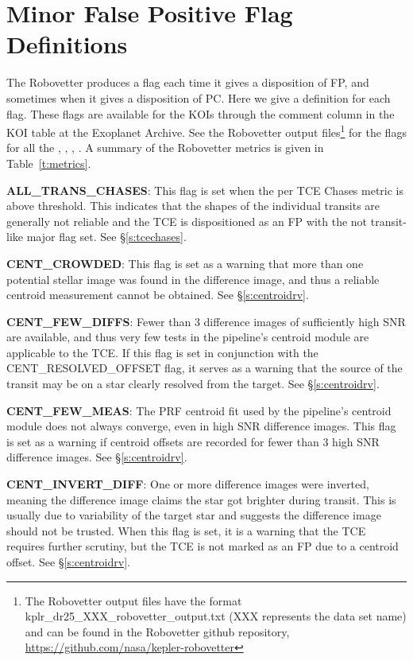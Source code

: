 \section{Minor False Positive Flag Definitions}
\label{s:minorflags}
The Robovetter produces a flag each time it gives a disposition of FP, and sometimes when it gives a disposition of PC.  Here we give a definition for each flag.   These flags are available for the KOIs through the comment column in the KOI table at the Exoplanet Archive. See the Robovetter output files\footnote{The Robovetter output files have the format kplr\_dr25\_XXX\_robovetter\_output.txt (XXX represents the data set name) and can be found in the Robovetter github repository, \url{https://github.com/nasa/kepler-robovetter}} for the flags for all the , , , . A summary of the Robovetter metrics is given in Table~\ref{t:metrics}.


\textbf{ALL\_TRANS\_CHASES}: This flag is set when the per TCE Chases metric is above threshold. This indicates that the shapes of the individual transits are generally not reliable and the TCE is dispositioned as an FP with the not transit-like major flag set. See \S\ref{s:tcechases}.

\textbf{CENT\_CROWDED}: This flag is set as a warning that more than one potential stellar image was found in the difference image, and thus a reliable centroid measurement cannot be obtained. See \S\ref{s:centroidrv}.

\textbf{CENT\_FEW\_DIFFS}: Fewer than 3 difference images of sufficiently high SNR are available, and thus very few tests in the pipeline's centroid module are applicable to the TCE. If this flag is set in conjunction with the CENT\_RESOLVED\_OFFSET flag, it serves as a warning that the source of the transit may be on a star clearly resolved from the target. See \S\ref{s:centroidrv}.

\textbf{CENT\_FEW\_MEAS}: The PRF centroid fit used by the pipeline's centroid module does not always converge, even in high SNR difference images. This flag is set as a warning if centroid offsets are recorded for fewer than 3 high SNR difference images. See \S\ref{s:centroidrv}.

\textbf{CENT\_INVERT\_DIFF}: One or more difference images were inverted, meaning the difference image claims the star got brighter during transit. This is usually due to variability of the target star and suggests the difference image should not be trusted. When this flag is set, it is a warning that the TCE requires further scrutiny, but the TCE is not marked as an FP due to a centroid offset. See \S\ref{s:centroidrv}.

